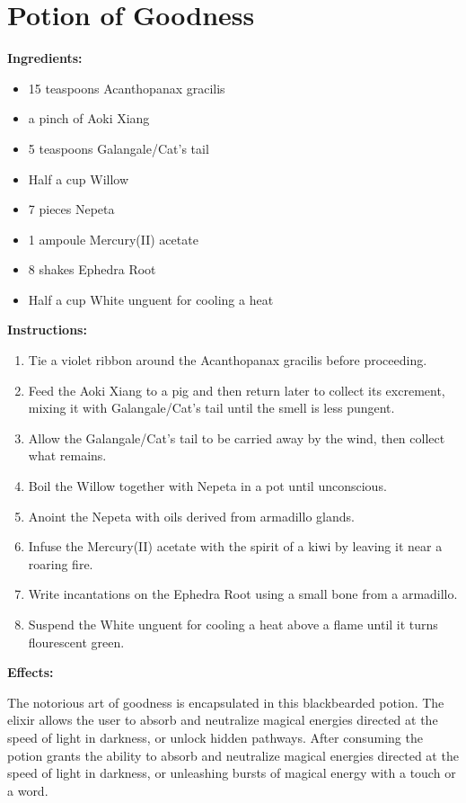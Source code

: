 \documentclass{article}
\begin{document}
\newpage
\section*{Potion of Goodness}

\textbf{Ingredients:}

\begin{itemize}
  \item 15 teaspoons Acanthopanax gracilis
  \item a pinch of Aoki Xiang
  \item 5 teaspoons Galangale/Cat's tail
  \item Half a cup Willow
  \item 7 pieces Nepeta
  \item 1 ampoule Mercury(II) acetate
  \item 8 shakes Ephedra Root
  \item Half a cup White unguent for cooling a heat
\end{itemize}

\textbf{Instructions:}

\begin{enumerate}
  \item Tie a violet ribbon around the Acanthopanax gracilis before proceeding.
  \item Feed the Aoki Xiang to a pig and then return later to collect its excrement, mixing it with Galangale/Cat's tail until the smell is less pungent.
  \item Allow the Galangale/Cat's tail to be carried away by the wind, then collect what remains.
  \item Boil the Willow together with Nepeta in a pot until unconscious.
  \item Anoint the Nepeta with oils derived from armadillo glands.
  \item Infuse the Mercury(II) acetate with the spirit of a kiwi by leaving it near a roaring fire.
  \item Write incantations on the Ephedra Root using a small bone from a armadillo.
  \item Suspend the White unguent for cooling a heat above a flame until it turns flourescent green.
\end{enumerate}

\textbf{Effects:}

The notorious art of goodness is encapsulated in this blackbearded potion. The elixir allows the user to absorb and neutralize magical energies directed at the speed of light in darkness, or unlock hidden pathways. After consuming the potion grants the ability to absorb and neutralize magical energies directed at the speed of light in darkness, or unleashing bursts of magical energy with a touch or a word.
\end{document}
